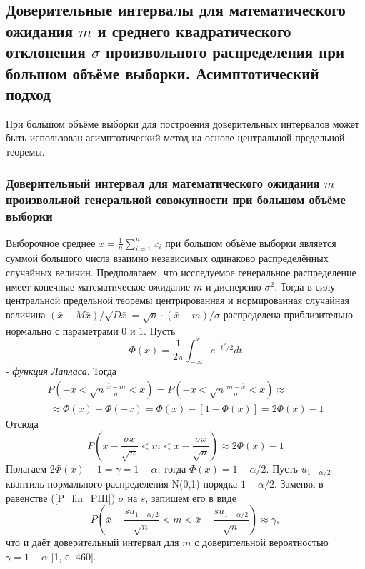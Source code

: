 \documentclass[a4paper]{article}
\begin{document}
    \subsection{Доверительные интервалы для математического ожидания $m$ и среднего квадратического отклонения $\sigma$ произвольного распределения при большом объёме выборки. Асимптотический подход}
    При большом объёме выборки для построения доверительных интервалов может быть использован асимптотический метод на основе центральной предельной теоремы.
    \subsubsection{Доверительный интервал для математического ожидания $m$ произвольной генеральной совокупности при большом объёме выборки}
    Выборочное среднее $\bar{x} = \frac{1}{n}\sum_{i = 1}^{n}{x_{i}}$ при большом объёме выборки является суммой большого числа взаимно независимых одинаково распределённых случайных величин. Предполагаем, что исследуемое генеральное распределение имеет конечные математическое ожидание $m$ и дисперсию $\sigma^{2}$. Тогда в силу центральной предельной теоремы центрированная и нормированная случайная величина $(\bar{x} - M\bar{x}) / \sqrt{D\bar{x}} = \sqrt{n}·(\bar{x}-m)/\sigma$ распределена приблизительно нормально с параметрами 0 и 1. Пусть
    \begin{equation}
        \Phi(x) = \frac{1}{2\pi}\int_{-\infty}^{x}{e^{-t^{2}/2}dt}
        \label{f_lapl}
    \end{equation}
    - \textit{функция Лапласа}. Тогда
    \begin{multline}
        P\left(-x < \sqrt{n}\frac{\bar{x} - m}{\sigma} < x \right) = 
        P\left(-x < \sqrt{n}\frac{m - \bar{x}}{\sigma} < x \right) \approx \\\
        \approx \Phi(x) - \Phi(-x)=\Phi(x) - [1 - \Phi(x)] = 2\Phi(x) - 1
        \label{P_PHI}
    \end{multline}
    Отсюда
    \begin{equation}
        P\left(\bar{x} - \frac{\sigma x}{\sqrt{n}} < m < \bar{x} - \frac{\sigma x}{\sqrt{n}} \right) \approx 2\Phi(x) - 1
        \label{P_fin_PHI}
    \end{equation}
    Полагаем $2\Phi(x) - 1 = \gamma = 1 - \alpha$; тогда $\Phi(x) = 1 - \alpha/2$. Пусть $u_{1-\alpha/2}$ — квантиль нормального распределения N(0,1) порядка $1-\alpha/2$. Заменяя в равенстве (\ref{P_fin_PHI}) $\sigma$ на $s$, запишем его в виде
    \begin{equation}
        P\left(\bar{x} - \frac{su_{1-\alpha/2}}{\sqrt{n}} < m < \bar{x} - \frac{su_{1-\alpha/2}}{\sqrt{n}} \right) \approx \gamma,
        \label{P_fin_u}
    \end{equation}
    что и даёт доверительный интервал для $m$ с доверительной вероятностью $\gamma = 1-\alpha$ [1, с. 460].
    
\end{document}
